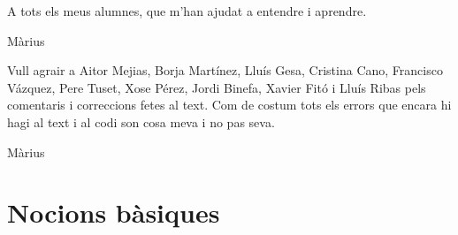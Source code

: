 \begin{dedication}
 A tots els meus alumnes, que m'han ajudat a entendre i aprendre.
 \par   %
    \vspace{\baselineskip}
    Màrius

    \vspace{4\baselineskip}
    \vspace{4\baselineskip}
    Vull agrair a Aitor Mejias, Borja Martínez, Lluís Gesa, Cristina Cano, Francisco Vázquez, Pere Tuset, Xose Pérez, Jordi Binefa, Xavier Fitó i Lluís Ribas pels comentaris i correccions fetes al text. Com de costum tots els errors que encara hi hagi al text i al codi son cosa meva i no pas seva.
    
    \vspace{\baselineskip}
    Màrius
\end{dedication}





\pagestyle{empty} %

\tableofcontents %

\cleardoublepage %

\pagestyle{fancy} %


\part{Nocions bàsiques}

